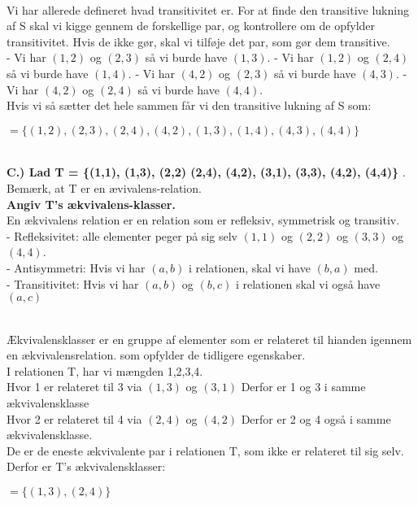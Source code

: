 \\
Vi har allerede defineret hvad transitivitet er. For at finde den transitive lukning af S skal vi kigge gennem de forskellige par, og kontrollere om de opfylder transitivitet. Hvis de ikke gør, skal vi tilføje det par, som gør dem transitive.
\\
- Vi har \((1, 2)\) og \((2, 3)\) så vi burde have \((1, 3)\).
- Vi har \((1, 2)\) og \((2, 4)\) så vi burde have \((1, 4)\).
- Vi har \((4, 2)\) og \((2, 3)\) så vi burde have \((4, 3)\).
- Vi har \((4, 2)\) og \((2, 4)\) så vi burde have \((4, 4)\).
\\
Hvis vi så sætter det hele sammen får vi den transitive lukning af S som: \\
\begin{center}
\(= \{(1, 2), (2, 3), (2, 4), (4, 2), (1, 3), (1, 4), (4, 3), (4, 4)\}\)
\end{center}
\\



\textbf{C.) Lad T = \{(1,1), (1,3), (2,2) (2,4), (4,2), (3,1), (3,3), (4,2), (4,4)\}} .
\\
Bemærk, at T er en ævivalens-relation. 
\\
\textbf{Angiv T's ækvivalens-klasser.}
\\ 
En ækvivalens relation er en relation som er refleksiv, symmetrisk og transitiv. \\

- Refleksivitet: alle elementer peger på sig selv \((1,1)\) og \((2,2)\) og \((3,3)\) og \((4,4)\). \\
- Antisymmetri: Hvis vi har \((a, b)\) i relationen, skal vi have \((b, a)\) med. \\
- Transitivitet: Hvis vi har \((a, b)\) og \((b, c)\) i relationen skal vi også have \((a, c)\) 

\\ 
Ækvivalensklasser er en gruppe af elementer som er relateret til hianden igennem en ækvivalensrelation. som opfylder de tidligere egenskaber.
\\
I relationen T, har vi mængden {1,2,3,4}.\\
Hvor 1 er relateret til 3 via \((1,3)\) og \((3,1)\) 
Derfor er 1 og 3 i samme ækvivalensklasse\\
Hvor 2 er relateret til 4 via \((2,4)\) og \((4,2)\) 
Derfor er 2 og 4 også i samme ækvivalensklasse. 
\\
De er de eneste ækvivalente par i relationen T, som ikke er relateret til sig selv.\\
Derfor er T's ækvivalensklasser:
\begin{center}
    \(= \{(1, 3), (2, 4)\}\)
\end{center}